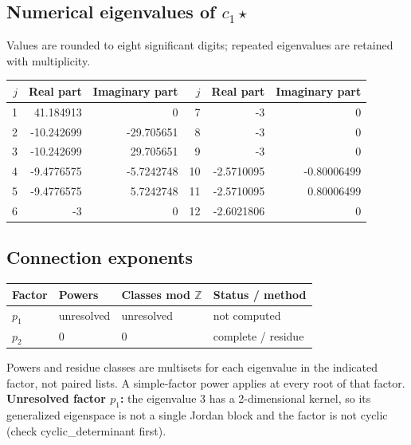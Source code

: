\documentclass[10pt,a4paper]{article}
\begin{document}
\subsection*{Numerical eigenvalues of $c_1\star$}
Values are rounded to eight significant digits; repeated eigenvalues are retained with multiplicity.
\begin{center}\small\begin{tabular}{rrr@{\qquad}rrr}\toprule $j$ & Real part & Imaginary part & $j$ & Real part & Imaginary part\\\midrule
1 & 41.184913 & 0 & 7 & -3 & 0\\
2 & -10.242699 & -29.705651 & 8 & -3 & 0\\
3 & -10.242699 & 29.705651 & 9 & -3 & 0\\
4 & -9.4776575 & -5.7242748 & 10 & -2.5710095 & -0.80006499\\
5 & -9.4776575 & 5.7242748 & 11 & -2.5710095 & 0.80006499\\
6 & -3 & 0 & 12 & -2.6021806 & 0\\
\bottomrule\end{tabular}\end{center}
\subsection*{Connection exponents}
\begin{center}\begin{tabular}{llll}\toprule Factor & Powers & Classes mod $\mathbb Z$ & Status / method\\\midrule
$p_{1}$ & unresolved & unresolved & not computed\\
$p_{2}$ & $0$ & $0$ & complete / residue\\
\bottomrule\end{tabular}\end{center}
Powers and residue classes are multisets for each eigenvalue in the indicated factor, not paired lists. A simple-factor power applies at every root of that factor.
\textbf{Unresolved factor $p_{1}$:} the eigenvalue 3 has a 2-dimensional kernel, so its generalized eigenspace is not a single Jordan block and the factor is not cyclic (check cyclic\_determinant first).
\end{document}
